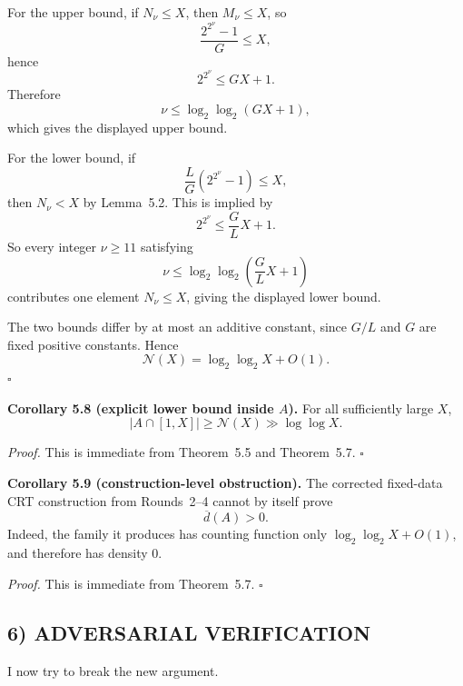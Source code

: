 For the upper bound, if $N_\nu\le X$, then $M_\nu\le X$, so
\[
\frac{2^{2^\nu}-1}{G}\le X,
\]
hence
\[
2^{2^\nu}\le GX+1.
\]
Therefore
\[
\nu\le \log_2\log_2(GX+1),
\]
which gives the displayed upper bound.

For the lower bound, if
\[
\frac{L}{G}\left(2^{2^\nu}-1\right)\le X,
\]
then $N_\nu<X$ by Lemma~5.2. This is implied by
\[
2^{2^\nu}\le \frac{G}{L}X+1.
\]
So every integer $\nu\ge 11$ satisfying
\[
\nu\le \log_2\log_2\!\left(\frac{G}{L}X+1\right)
\]
contributes one element $N_\nu\le X$, giving the displayed lower bound.

The two bounds differ by at most an additive constant, since $G/L$ and $G$ are fixed positive constants. Hence
\[
\mathcal{N}(X)=\log_2\log_2 X+O(1).
\]
\hfill$\square$

\medskip
\noindent\textbf{Corollary 5.8 (explicit lower bound inside $A$).}
For all sufficiently large $X$,
\[
|A\cap[1,X]|\ge \mathcal{N}(X)\gg \log\log X.
\]

\medskip
\noindent\emph{Proof.}
This is immediate from Theorem~5.5 and Theorem~5.7. \hfill$\square$

\medskip
\noindent\textbf{Corollary 5.9 (construction-level obstruction).}
The corrected fixed-data CRT construction from Rounds~2--4 cannot by itself prove
\[
\overline d(A)>0.
\]
Indeed, the family it produces has counting function only $\log_2\log_2 X+O(1)$, and therefore has density $0$.

\medskip
\noindent\emph{Proof.}
This is immediate from Theorem~5.7. \hfill$\square$

\subsection*{6) ADVERSARIAL VERIFICATION}

I now try to break the new argument.


